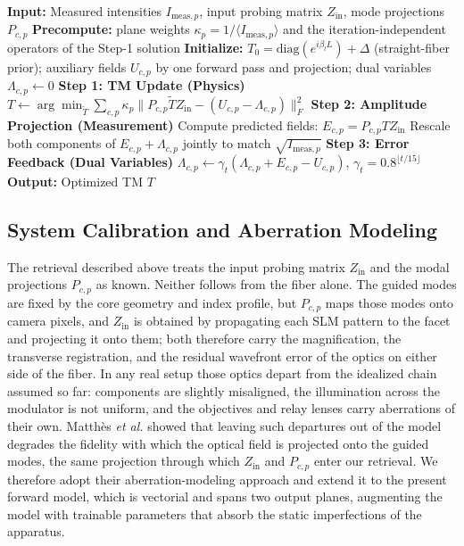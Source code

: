 \documentclass{article}
\begin{document}
\begin{algorithm*}[t]
\caption{Fast ADMM TM Retrieval in the Modal Basis}
\label{alg:tm_retrieval}
\begin{algorithmic}[1]
\State \textbf{Input:} Measured intensities $I_{\text{meas},p}$, input probing matrix $Z_{\text{in}}$, mode projections $P_{c,p}$
\State \textbf{Precompute:} plane weights $\kappa_p = 1/\langle I_{\text{meas},p}\rangle$ and the iteration-independent operators of the Step-1 solution
\State \textbf{Initialize:} $T_0 = \mathrm{diag}(e^{i\beta_l L}) + \Delta$ (straight-fiber prior); auxiliary fields $U_{c,p}$ by one forward pass and projection; dual variables $\Lambda_{c,p} \gets 0$
    \State \textbf{Step 1: TM Update (Physics)}
    \State \quad $T \gets \arg\min_{\tilde{T}} \sum_{c,p} \kappa_p \| P_{c,p} \tilde{T} Z_{\text{in}} - (U_{c,p} - \Lambda_{c,p}) \|_F^2$ 
    \State \textbf{Step 2: Amplitude Projection (Measurement)}
    \State \quad Compute predicted fields: $E_{c,p} = P_{c,p} T Z_{\text{in}}$
    \State \quad Rescale both components of $E_{c,p} + \Lambda_{c,p}$ jointly to match $\sqrt{I_{\text{meas},p}}$ 
    \State \textbf{Step 3: Error Feedback (Dual Variables)}
    \State \quad $\Lambda_{c,p} \gets \gamma_t (\Lambda_{c,p} + E_{c,p} - U_{c,p})$, \quad $\gamma_t = 0.8^{\lfloor t/15 \rfloor}$
\EndFor
\State \textbf{Output:} Optimized TM $T$
\end{algorithmic}
\end{algorithm*}

\subsection{System Calibration and Aberration Modeling}
The retrieval described above treats the input probing matrix $Z_{\text{in}}$ and the modal projections $P_{c,p}$ as known.
Neither follows from the fiber alone.
The guided modes are fixed by the core geometry and index profile, but $P_{c,p}$ maps those modes onto camera pixels, and $Z_{\text{in}}$ is obtained by propagating each SLM pattern to the facet and projecting it onto them; both therefore carry the magnification, the transverse registration, and the residual wavefront error of the optics on either side of the fiber.
In any real setup those optics depart from the idealized chain assumed so far: components are slightly misaligned, the illumination across the modulator is not uniform, and the objectives and relay lenses carry aberrations of their own.
Matth\`{e}s \textit{et al.} \cite{learning_and_avoiding} showed that leaving such departures out of the model degrades the fidelity with which the optical field is projected onto the guided modes, the same projection through which $Z_{\text{in}}$ and $P_{c,p}$ enter our retrieval.
We therefore adopt their aberration-modeling approach and extend it to the present forward model, which is vectorial and spans two output planes, augmenting the model with trainable parameters that absorb the static imperfections of the apparatus.
\end{document}
